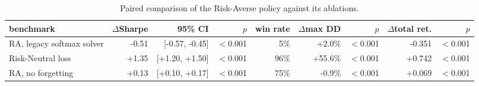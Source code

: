 \begin{table}[ht!]
\centering
\footnotesize
\setlength{\tabcolsep}{4pt}
\begin{tabular}{lrrrrrrrr}
\hline
benchmark & $\Delta$Sharpe & 95\% CI & $p$ & win rate & $\Delta$max DD & $p$ & $\Delta$total ret. & $p$ \\
\hline
RA, legacy softmax solver & -0.51 & [-0.57, -0.45] & $<$0.001 & 5\% & +2.0\% & $<$0.001 & -0.351 & $<$0.001 \\
Risk-Neutral loss & +1.35 & [+1.20, +1.50] & $<$0.001 & 96\% & +55.6\% & $<$0.001 & +0.742 & $<$0.001 \\
RA, no forgetting & +0.13 & [+0.10, +0.17] & $<$0.001 & 75\% & -0.9\% & $<$0.001 & +0.069 & $<$0.001 \\
\hline
\end{tabular}
\caption{Paired comparison of the Risk-Averse policy against its ablations.}
\label{tab:ablation_paired_oos2026}
\end{table}

